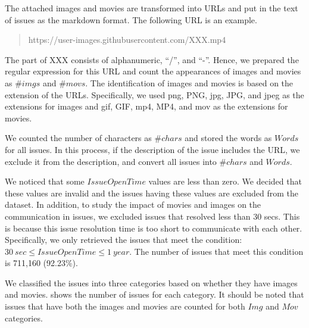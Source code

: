 The attached images and movies are transformed into 
URLs and put in the text of issues as the markdown format. 
The following URL is an example.

\begin{quote}
	https://user-images.githubusercontent.com/XXX.mp4
\end{quote}

\noindent{}
The part of XXX consists of alphanumeric, ``/'', and ``-''.
Hence, we prepared the regular expression for this URL and 
count the appearances of images and movies as $\#imgs$ and $\#movs$. 
The identification of images and movies is based on the extension of 
the URLs. 
Specifically, we used png, PNG, jpg, JPG, and jpeg as 
the extensions for images and 
gif, GIF, mp4, MP4, and mov as the extensions for movies.

We counted the number of characters as $\#chars$ and 
stored the words as $Words$ for all issues. 
In this process, if the description of the issue 
includes the URL, we exclude it from the description, 
and convert all issues into $\#chars$ and $Words$.

We noticed that some $IssueOpenTime$ values are less than zero. 
We decided that these values are invalid and the issues having 
these values are excluded from the dataset. 
In addition, to study the impact of movies and images on 
the communication in issues, 
we excluded issues that resolved less than 30 secs. 
This is because this issue resolution time is too short 
to communicate with each other. 
Specifically, we only retrieved the issues that meet 
the condition: $30\ sec \leq IssueOpenTime \leq 1\ year$.
The number of issues that meet this condition is 711,160 (92.23\%).



We classified the issues into three categories based on 
whether they have images and movies. 
 shows the number of issues for each category. 
It should be noted that issues that have both 
the images and movies are counted for both 
$Img$ and $Mov$ categories. 

% 
